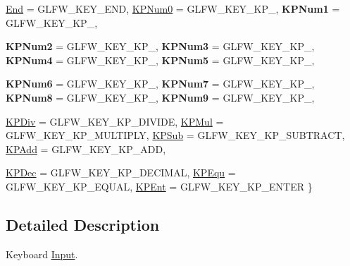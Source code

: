 \begin{DoxyCompactItemize}
\hyperlink{namespace_f2_c_1_1_keyboard_event_a13172bec547dc5eb2eee6c4fcd64c486af2f4315f2cd30aeca96ba809dc98f682}{End} =  GLFW\_\-KEY\_\-END, 
\hyperlink{namespace_f2_c_1_1_keyboard_event_a13172bec547dc5eb2eee6c4fcd64c486afc4117d4aa0acc96407c4a003b9466fe}{KPNum0} =  GLFW\_\-KEY\_\-KP\_, 
{\bfseries KPNum1} =  GLFW\_\-KEY\_\-KP\_, 
\par
{\bfseries KPNum2} =  GLFW\_\-KEY\_\-KP\_, 
{\bfseries KPNum3} =  GLFW\_\-KEY\_\-KP\_, 
{\bfseries KPNum4} =  GLFW\_\-KEY\_\-KP\_, 
{\bfseries KPNum5} =  GLFW\_\-KEY\_\-KP\_, 
\par
{\bfseries KPNum6} =  GLFW\_\-KEY\_\-KP\_, 
{\bfseries KPNum7} =  GLFW\_\-KEY\_\-KP\_, 
{\bfseries KPNum8} =  GLFW\_\-KEY\_\-KP\_, 
{\bfseries KPNum9} =  GLFW\_\-KEY\_\-KP\_, 
\par
\hyperlink{namespace_f2_c_1_1_keyboard_event_a13172bec547dc5eb2eee6c4fcd64c486ab9ed07a34f2168901ab616dbc613939a}{KPDiv} =  GLFW\_\-KEY\_\-KP\_\-DIVIDE, 
\hyperlink{namespace_f2_c_1_1_keyboard_event_a13172bec547dc5eb2eee6c4fcd64c486a2cecfa25a3c9541bc08c0ed8bd29b326}{KPMul} =  GLFW\_\-KEY\_\-KP\_\-MULTIPLY, 
\hyperlink{namespace_f2_c_1_1_keyboard_event_a13172bec547dc5eb2eee6c4fcd64c486ac4e241535378f81e5961de3bf245a409}{KPSub} =  GLFW\_\-KEY\_\-KP\_\-SUBTRACT, 
\hyperlink{namespace_f2_c_1_1_keyboard_event_a13172bec547dc5eb2eee6c4fcd64c486a88521d0a4e1a6df57ab87a20d9f4ff2f}{KPAdd} =  GLFW\_\-KEY\_\-KP\_\-ADD, 
\par
\hyperlink{namespace_f2_c_1_1_keyboard_event_a13172bec547dc5eb2eee6c4fcd64c486aad999f4132a5137f1a2cff69fd3b900a}{KPDec} =  GLFW\_\-KEY\_\-KP\_\-DECIMAL, 
\hyperlink{namespace_f2_c_1_1_keyboard_event_a13172bec547dc5eb2eee6c4fcd64c486a2df88c69c63cdbf1e7ab3f850bac5fe7}{KPEqu} =  GLFW\_\-KEY\_\-KP\_\-EQUAL, 
\hyperlink{namespace_f2_c_1_1_keyboard_event_a13172bec547dc5eb2eee6c4fcd64c486afc44f0625a0ce586bd15509b7562adb8}{KPEnt} =  GLFW\_\-KEY\_\-KP\_\-ENTER
 \}
\end{DoxyCompactItemize}


\subsection{Detailed Description}
Keyboard \hyperlink{class_f2_c_1_1_input}{Input}. 

